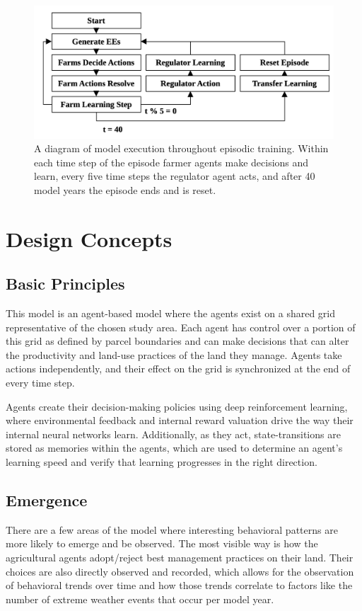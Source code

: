 \begin{figure}
    \centering
    \includegraphics[width=.8\linewidth]{figure/farm-flow.png}
    \caption{A diagram of model execution throughout episodic training.
    Within each time step of the episode farmer agents make decisions
    and learn, every five time steps the regulator agent acts, and
    after 40 model years the episode ends and is reset.}
    \label{fig:farm_flow}
\end{figure}

\section{Design Concepts}

\subsection{Basic Principles}
This model is an agent-based model where the agents exist on a shared grid
representative of the chosen study area. 
Each agent has control over a portion of this grid as defined by 
parcel boundaries and can make decisions that can alter the
productivity and land-use practices of the land they manage. 
Agents take actions independently, 
and their effect on the grid is synchronized at the end of every time step.

Agents create their decision-making policies 
using deep reinforcement learning, 
where environmental feedback and internal reward valuation 
drive the way their internal neural networks learn. 
Additionally, as they act, state-transitions are stored as memories 
within the agents, 
which are used to determine an agent's learning speed 
and verify that learning progresses in the right direction.

\subsection{Emergence}

There are a few areas of the model where interesting behavioral patterns are more likely to emerge and be observed. The most visible way is how the agricultural agents adopt/reject best management practices on their land. Their choices are also directly observed and recorded, which allows for the observation of behavioral trends over time and how those trends correlate to factors like the number of extreme weather events that occur per model year.

